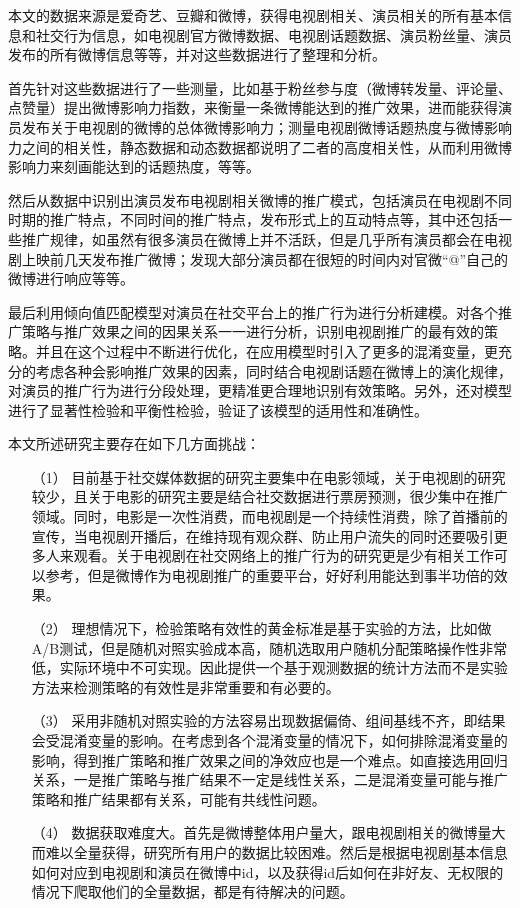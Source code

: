 本文的数据来源是爱奇艺、豆瓣和微博，获得电视剧相关、演员相关的所有基本信息和社交行为信息，如电视剧官方微博数据、电视剧话题数据、演员粉丝量、演员发布的所有微博信息等等，并对这些数据进行了整理和分析。

首先针对这些数据进行了一些测量，比如基于粉丝参与度（微博转发量、评论量、点赞量）提出微博影响力指数，来衡量一条微博能达到的推广效果，进而能获得演员发布关于电视剧的微博的总体微博影响力；测量电视剧微博话题热度与微博影响力之间的相关性，静态数据和动态数据都说明了二者的高度相关性，从而利用微博影响力来刻画能达到的话题热度，等等。

然后从数据中识别出演员发布电视剧相关微博的推广模式，包括演员在电视剧不同时期的推广特点，不同时间的推广特点，发布形式上的互动特点等，其中还包括一些推广规律，如虽然有很多演员在微博上并不活跃，但是几乎所有演员都会在电视剧上映前几天发布推广微博；发现大部分演员都在很短的时间内对官微“@”自己的微博进行响应等等。

最后利用倾向值匹配模型对演员在社交平台上的推广行为进行分析建模。对各个推广策略与推广效果之间的因果关系一一进行分析，识别电视剧推广的最有效的策略。并且在这个过程中不断进行优化，在应用模型时引入了更多的混淆变量，更充分的考虑各种会影响推广效果的因素，同时结合电视剧话题在微博上的演化规律，对演员的推广行为进行分段处理，更精准更合理地识别有效策略。另外，还对模型进行了显著性检验和平衡性检验，验证了该模型的适用性和准确性。

本文所述研究主要存在如下几方面挑战：

\begin{itemize}

\item[（1）]目前基于社交媒体数据的研究主要集中在电影领域，关于电视剧的研究较少，且关于电影的研究主要是结合社交数据进行票房预测，很少集中在推广领域。同时，电影是一次性消费，而电视剧是一个持续性消费，除了首播前的宣传，当电视剧开播后，在维持现有观众群、防止用户流失的同时还要吸引更多人来观看。关于电视剧在社交网络上的推广行为的研究更是少有相关工作可以参考，但是微博作为电视剧推广的重要平台，好好利用能达到事半功倍的效果。

\item[（2）]理想情况下，检验策略有效性的黄金标准是基于实验的方法，比如做A/B测试，但是随机对照实验成本高，随机选取用户随机分配策略操作性非常低，实际环境中不可实现。因此提供一个基于观测数据的统计方法而不是实验方法来检测策略的有效性是非常重要和有必要的。

\item[（3）]采用非随机对照实验的方法容易出现数据偏倚、组间基线不齐，即结果会受混淆变量的影响。在考虑到各个混淆变量的情况下，如何排除混淆变量的影响，得到推广策略和推广效果之间的净效应也是一个难点。如直接选用回归关系，一是推广策略与推广结果不一定是线性关系，二是混淆变量可能与推广策略和推广结果都有关系，可能有共线性问题。

\item[（4）]数据获取难度大。首先是微博整体用户量大，跟电视剧相关的微博量大而难以全量获得，研究所有用户的数据比较困难。然后是根据电视剧基本信息如何对应到电视剧和演员在微博中id，以及获得id后如何在非好友、无权限的情况下爬取他们的全量数据，都是有待解决的问题。


\end{itemize}

